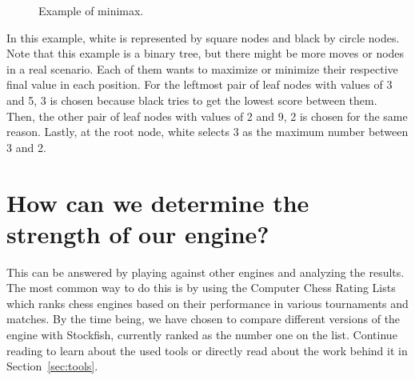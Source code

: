 \begin{figure}[H]
    \centering
    \caption{Example of minimax.}
    \label{fig:minimax}
\end{figure}

\noindent In this example, white is represented by square nodes and black by circle nodes. Note that this example is a binary tree, but there might be more moves or nodes in a real scenario. Each of them wants to maximize or minimize their respective final value in each position. For the leftmost pair of leaf nodes with values of 3 and 5, 3 is chosen because black tries to get the lowest score between them. Then, the other pair of leaf nodes with values of 2 and 9, 2 is chosen for the same reason. Lastly, at the root node, white selects 3 as the maximum number between 3 and 2.

\section{How can we determine the strength of our engine?}
\label{sec:how}

This can be answered by playing against other engines and analyzing the results. The most common way to do this is by using the Computer Chess Rating Lists which ranks chess engines based on their performance in various tournaments and matches. By the time being, we have chosen to compare different versions of the engine with Stockfish, currently ranked as the number one on the list. Continue reading to learn about the used tools or directly read about the work behind it in Section~\ref{sec:tools}.

